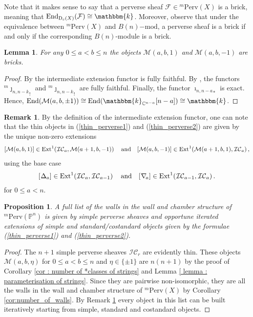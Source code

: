 \documentclass[11pt]{amsart}
\newtheorem{proposition}[theorem]{Proposition}
\newtheorem{lemma}[theorem]{Lemma}
\theoremstyle{definition}
\newtheorem{remark}[theorem]{Remark}
\newcommand{\C}{\mathbb{C}}
\newcommand{\kk}{\mathbbm{k}}
\newcommand{\PP}{\mathbb{P}}
\newcommand{\cat}[1]{\mathrm{#1}}
\renewcommand{\mod}[1]{{#1}\mathrm{-mod}}
\newcommand{\perv}[2]{{}^{#1}\cat{Perv}\!\left(#2\right)}
\newcommand{\pfun}[2]{{}^{#1}{#2}}
\newcommand{\ic}[2]{\pfun{#1}{\sh{IC}_{#2}}}
\newcommand{\constr}[2]{\cat{D}_{#1}({#2})}
\newcommand{\Ext}[4]{{\mathrm{Ext}_{#1}^{#2}}\!\left(#3,#4\right)}
\newcommand{\End}[1]{\mathrm{End}\!\left(#1\right)}
\newcommand{\sh}[1]{\mathcal{#1}}
\newcommand{\stan}[2]{\pfun{#1}{\Delta_{#2}}}
\newcommand{\costan}[2]{\pfun{#1}{\nabla_{\! #2}}}
\begin{document}
Note that it makes sense to say that a perverse sheaf $\mathcal{F}\in\perv{m}{X}$ is a brick, meaning that $\mathrm{End}_{\constr{c}{X}}(\mathcal{F})\cong \kk$. Moreover, observe that under the equivalence between $\perv{m}{X}$ and $\mod{B(n)}$, a perverse sheaf is a brick if and only if the corresponding $B(n)$-module is a brick.

\begin{lemma}
    For any $0\leq a < b \leq n$ the objects $\mathcal{M}(a,b,1)$ and $\mathcal{M}(a,b,-1)$ are  bricks.
\end{lemma}
\begin{proof}
    By \cite[Lemma 3.3.3]{Achar} the intermediate extension functor is fully faithful. By \cite[Proposition 1.4.17(iii)]{BBD}, the functors $^m{\jmath_{n,n-k}}_!$ and $^m{\jmath_{n,n-k}}_!$ are fully faithful. Finally, the functor ${\imath_{n,n-a}}_*$ is exact. Hence, $\End{\mathcal{M}(a,b,\pm1)}\cong\End{\kk_{\C^{n-a}}[n-a]}\cong\kk$. %
\end{proof}

\begin{remark}\label{rem:iterated_exts} By the definition of the intermediate extension functor, one can note that the thin objects in (\ref{thin_perverse1}) and (\ref{thin_perverse2}) are given by the unique non-zero extensions
    \[
    [\mathcal{M}(a,b,1)]\in\Ext{}{1}{\ic{}{a}}{\mathcal{M}(a+1,b, -1)}\quad\hbox{and}\quad[\mathcal{M}(a,b,-1)]\in\Ext{}{1}{\mathcal{M}(a+1,b,1)}{\ic{}{a}},
    \]
using the base case 
\[
    [\stan{}{a}]\in\Ext{}{1}{\ic{}{a}}{\ic{}{a-1}} \quad \hbox{and} \quad [\costan{}{a}]\in\Ext{}{1}{\ic{}{a-1}}{\ic{}{a}}.
    \] 
for $0\leq a <n$.
\end{remark}

\begin{proposition}\label{prop : perverse walls}
    A full list of the walls in the wall and chamber structure of $\perv{m}{\PP^n}$ is given by simple perverse sheaves and opportune iterated extensions of simple and standard/costandard objects given by the formulae (\ref{thin_perverse1}) and (\ref{thin_perverse2}).
\end{proposition}
\begin{proof}
The $n+1$ simple perverse sheaves $\ic{}{r}$ are evidently thin. These objects $\mathcal{M}(a,b,\eta)$ for $0\leq a<b\leq n$ and $\eta\in\{\pm1\}$ are $n(n+1)$ by the proof of Corollary \ref{cor : number of *classes of strings} and Lemma \ref{ lemma : parameterisation of strings}. Since they are pairwise non-isomorphic, they are all the walls in the wall and chamber structure of $\perv{m}{X}$ by Corollary \ref{cor:number_of_walls}. By Remark \ref{rem:iterated_exts} every object in this list can be built iteratively starting from simple, standard and costandard objects.
\end{proof}
    
\end{document}

